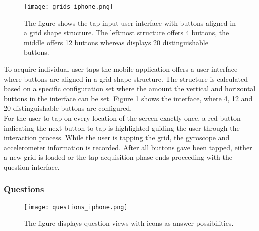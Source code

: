 \begin{figure}[h!]
  \centering
  \texttt{[image: grids\_iphone.png]}
  \caption{The figure shows the tap input user interface with buttons aligned in a grid shape structure. The leftmost structure offers 4 buttons, the middle offers 12 buttons whereas displays 20 distinguishable buttons.}\label{fig:grid}
\end{figure}

To acquire individual user taps the mobile application offers a user interface where buttons are aligned in a grid shape structure. The structure is calculated based on a specific configuration set where the amount the vertical and horizontal buttons in the interface can be set. Figure \ref{fig:grid} shows the interface, where 4, 12 and 20 distinguishable buttons are configured.\\

For the user to tap on every location of the screen exactly once, a red button indicating the next button to tap is highlighted guiding the user through the interaction process. While the user is tapping the grid, the gyroscope and accelerometer information is recorded. After all buttons gave been tapped, either a new grid is loaded or the tap acquisition phase ends proceeding with the question interface.





\subsubsection{Questions}
\begin{figure}[h!]
  \centering
  \texttt{[image: questions\_iphone.png]}
  \caption{The figure displays question views with icons as answer possibilities.}
\end{figure}

